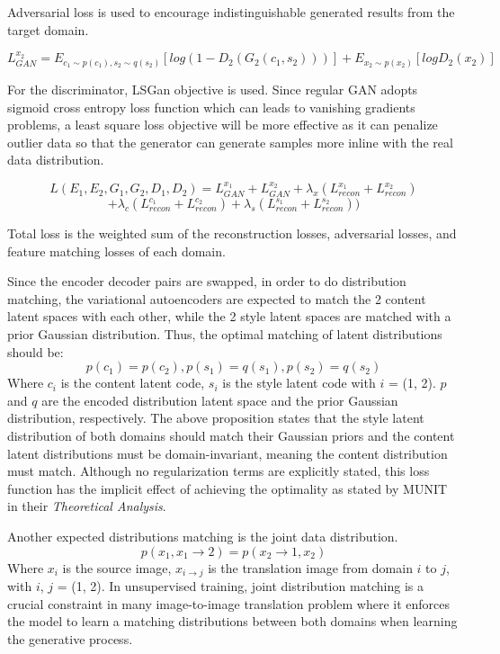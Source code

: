 \documentclass[12pt]{report}
\begin{document}
Adversarial loss is used to encourage indistinguishable generated results from the target domain.

\[L^{x_2}_{GAN} = E_{c_1\sim p(c_1), s_2\sim q(s_2)}[log(1 - D_2(G_2(c_1, s_2)))] + E_{x_2\sim p(x_2)}[log D_2(x_2)]\]

For the discriminator, LSGan objective \cite{ls-gan} is used. Since regular GAN adopts sigmoid cross entropy loss function which can leads to vanishing gradients problems, a least square loss objective will be more effective as it can penalize outlier data so that the generator can generate samples more inline with the real data distribution.

\[L(E_1, E_2, G_1, G_2, D_1, D_2) = L^{x_1}_{GAN} + L^{x_2}_{GAN} + {\lambda}_x(L^{x_1}_{recon} + L^{x_2}_{recon}) \]
\[+ {\lambda}_c(L^{c_1}_{recon} + L^{c_2}_{recon}) + {\lambda}_s(L^{s_1}_{recon} + L^{s_2}_{recon}))\]
 
Total loss is the weighted sum of the reconstruction losses, adversarial losses, and feature matching losses of each domain.

Since the encoder decoder pairs are swapped, in order to do distribution matching, the variational autoencoders are expected to match the 2 content latent spaces with each other, while the 2 style latent spaces are matched with a prior Gaussian distribution. Thus, the optimal matching of latent distributions should be:
\[p(c_1) = p(c_2), p(s_1) = q(s_1), p(s_2) = q(s_2)\]
Where $c_i$ is the content latent code, $s_i$ is the style latent code with $i$ = (1, 2). $p$ and $q$ are the encoded distribution latent space and the prior Gaussian distribution, respectively. The above proposition states that the style latent distribution of both domains should match their Gaussian priors and the content latent distributions must be domain-invariant, meaning the content distribution must match. Although no regularization terms are explicitly stated, this loss function has the implicit effect of achieving the optimality as stated by MUNIT\cite{munit} in their \textit{Theoretical Analysis}.

Another expected distributions matching is the joint data distribution.
\[p(x_1, x_1\rightarrow2) = p(x_2\rightarrow1, x_2)\]
Where $x_i$ is the source image, $x_{i\rightarrow j}$ is the translation image from domain $i$ to $j$, with $i$, $j$ = (1, 2). In unsupervised training, joint distribution matching is a crucial constraint in many image-to-image translation problem where it enforces the model to learn a matching distributions between both domains when learning the generative process.
\end{document}

